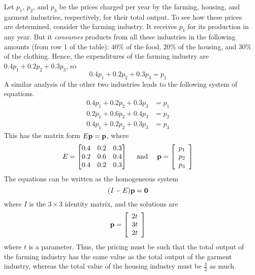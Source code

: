 \documentclass{ximera}
\begin{document}
\begin{example}
\begin{explanation}
  Let $p_{1}$, $p_{2}$, and $p_{3}$ be the prices charged per year by the farming, housing, and garment industries, respectively, for their total output. To see how these prices are determined, consider the farming industry. It receives $p_{1}$ for its production in any year. But it \textit{consumes} products from all these industries in the following amounts (from row 1 of the table): $40\%$ of the food, $20\%$ of the housing, and $30\%$ of the clothing. Hence, the expenditures of the farming industry are $0.4p_{1} + 0.2p_{2} + 0.3p_{3}$, so
\begin{equation*}
0.4p_{1} + 0.2p_{2} + 0.3p_{3} = p_{1}
\end{equation*}
A similar analysis of the other two industries leads to the following system of equations.
\begin{align*}
0.4p_{1} + 0.2p_{2} + 0.3p_{3} &= p_{1} \\
0.2p_{1} + 0.6p_{2} + 0.4p_{3} &= p_{2} \\
0.4p_{1} + 0.2p_{2} + 0.3p_{3} &= p_{3}
\end{align*}
This has the matrix form $E{\bf p} = {\bf p}$, where
\begin{equation*}
E = \begin{bmatrix}
0.4 & 0.2 & 0.3 \\
0.2 & 0.6 & 0.4 \\
0.4 & 0.2 & 0.3
\end{bmatrix} \quad \mbox{ and } \quad
{\bf p} = \left[ \begin{array}{c}
p_{1} \\
p_{2} \\
p_{3}
\end{array} \right]
\end{equation*}
The equations can be written as the homogeneous system
\begin{equation*}
(I - E){\bf p} = {\bf 0}
\end{equation*}
where $I$ is the $3 \times 3$ identity matrix, and the solutions are
\begin{equation*}
{\bf p} = \left[ \begin{array}{c}
2t \\
3t \\
2t
\end{array} \right]
\end{equation*}
where $t$ is a parameter. Thus, the pricing must be such that the total output of the farming industry has the same value as the total output of the garment industry, whereas the total value of the housing industry must be $\frac{3}{2}$ as much.
\end{explanation}
\end{example}
\end{document}

